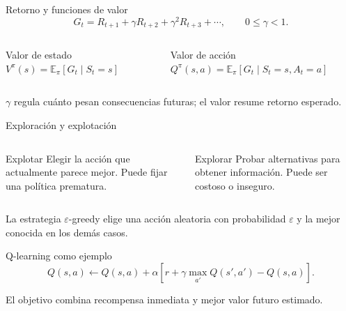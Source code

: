 \documentclass[aspectratio=169,10pt]{beamer}
\begin{document}
\begin{frame}{Retorno y funciones de valor}
  \small
  \[
    G_t=R_{t+1}+\gamma R_{t+2}+\gamma^2R_{t+3}+\cdots,
    \qquad 0\leq\gamma<1.
  \]
  \begin{columns}[T]
    \begin{block}{Valor de estado}
      $V^{\pi}(s)=\mathbb{E}_{\pi}[G_t\mid S_t=s]$
    \end{block}
    \begin{block}{Valor de acción}
      $Q^{\pi}(s,a)=\mathbb{E}_{\pi}[G_t\mid S_t=s,A_t=a]$
    \end{block}
  \end{columns}
  $\gamma$ regula cuánto pesan consecuencias futuras; el valor resume retorno esperado.
\end{frame}

\begin{frame}{Exploración y explotación}
  \begin{columns}[T]
    \begin{block}{Explotar}
      Elegir la acción que actualmente parece mejor. Puede fijar una política prematura.
    \end{block}
    \begin{block}{Explorar}
      Probar alternativas para obtener información. Puede ser costoso o inseguro.
    \end{block}
  \end{columns}
  \vspace{4mm}
  La estrategia $\varepsilon$-greedy elige una acción aleatoria con probabilidad $\varepsilon$ y la mejor conocida en los demás casos.
\end{frame}

\begin{frame}{Q-learning como ejemplo}
  \[
    Q(s,a)\leftarrow Q(s,a)+\alpha\left[r+\gamma\max_{a'}Q(s',a')-Q(s,a)\right].
  \]
  \begin{center}
  \end{center}
  El objetivo combina recompensa inmediata y mejor valor futuro estimado.
\end{frame}
\end{document}

